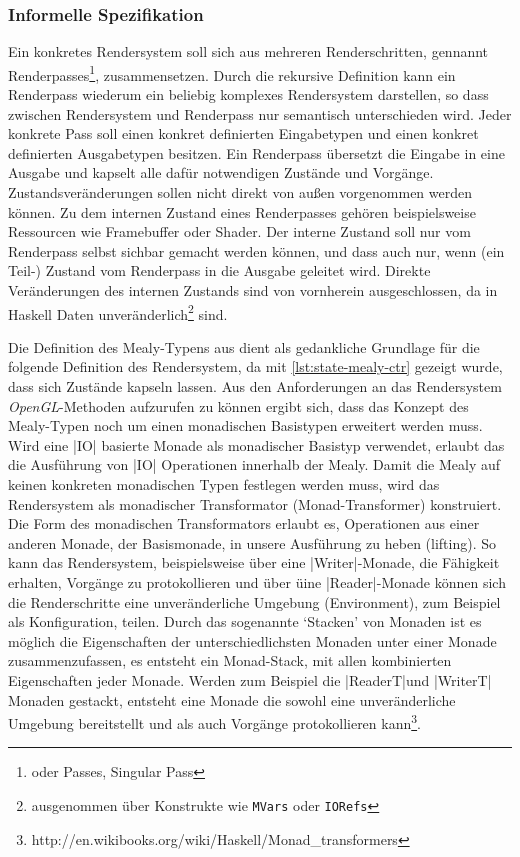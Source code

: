 \subsubsection{Informelle Spezifikation}
Ein konkretes Rendersystem soll sich aus mehreren Renderschritten, gennannt Renderpasses\footnote{oder Passes, Singular Pass}, zusammensetzen. Durch die rekursive Definition kann ein Renderpass wiederum ein beliebig komplexes Rendersystem darstellen, so dass zwischen Rendersystem und Renderpass nur semantisch unterschieden wird. Jeder konkrete Pass soll einen konkret definierten Eingabetypen und einen konkret definierten Ausgabetypen besitzen. Ein Renderpass übersetzt die Eingabe in eine Ausgabe und kapselt alle dafür notwendigen Zustände und Vorgänge. Zustandsveränderungen sollen nicht direkt von außen vorgenommen werden können. Zu dem internen Zustand eines Renderpasses gehören beispielsweise Ressourcen wie Framebuffer oder Shader. Der interne Zustand soll nur vom Renderpass selbst sichbar gemacht werden können, und dass auch nur, wenn (ein Teil-) Zustand vom Renderpass in die Ausgabe geleitet wird. Direkte Veränderungen des internen Zustands sind von vornherein ausgeschlossen, da in Haskell Daten unveränderlich\footnote{ausgenommen über Konstrukte wie \texttt{MVars} oder \texttt{IORefs}} sind.

Die Definition des Mealy-Typens aus  dient als gedankliche Grundlage für die folgende Definition des Rendersystem, da mit \ref{lst:state-mealy-ctr} gezeigt wurde, dass sich Zustände kapseln lassen. Aus den Anforderungen an das Rendersystem \textit{OpenGL}-Methoden aufzurufen zu können ergibt sich, dass das Konzept des Mealy-Typen noch um einen monadischen Basistypen erweitert werden muss. Wird eine |IO| basierte Monade als monadischer Basistyp verwendet, erlaubt das die Ausführung von |IO| Operationen innerhalb der Mealy. Damit die Mealy auf keinen konkreten monadischen Typen festlegen werden muss, wird das Rendersystem als monadischer Transformator (Monad-Transformer) konstruiert. Die Form des monadischen Transformators erlaubt es, Operationen aus einer anderen Monade, der Basismonade, in unsere Ausführung zu heben (lifting). So kann das Rendersystem, beispielsweise über eine |Writer|-Monade, die Fähigkeit erhalten, Vorgänge zu protokollieren und über üine |Reader|-Monade können sich die Renderschritte eine unveränderliche Umgebung (Environment), zum Beispiel als Konfiguration, teilen. Durch das sogenannte `Stacken' von Monaden ist es möglich die Eigenschaften der unterschiedlichsten Monaden unter einer Monade zusammenzufassen, es entsteht ein Monad-Stack, mit allen kombinierten Eigenschaften jeder Monade. Werden zum Beispiel die |ReaderT|\footnotemark und |WriterT| Monaden gestackt, entsteht eine Monade die sowohl eine unveränderliche Umgebung bereitstellt und als auch Vorgänge protokollieren kann\footnote{http://en.wikibooks.org/wiki/Haskell/Monad\_transformers}.

